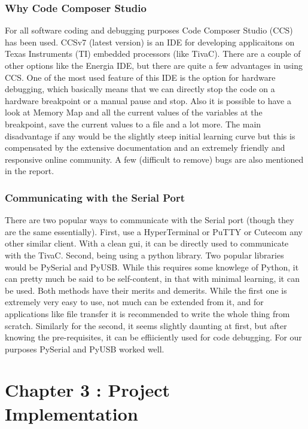 \documentclass{article}
\begin{document}
\subsubsection{Why Code Composer Studio}
For all software coding and debugging purposes Code Composer Studio (CCS) has been used. CCSv7 (latest version) is an IDE for developing applicaitons on Texas Instruments (TI) embedded processors (like TivaC). There are a couple of other options like the Energia IDE, but there are quite a few advantages in using CCS. One of the most used feature of this IDE is the option for hardware debugging, which basically means that we can directly stop the code on a hardware breakpoint or a manual pause and stop. Also it is possible to have a look at Memory Map and all the current values of the variables at the breakpoint, save the current values to a file and a lot more. The main disadvantage if any would be the slightly steep initial learning curve but this is compensated by the extensive documentation and an extremely friendly and responsive online community. A few (difficult to remove) bugs are also mentioned in the report. 

\subsubsection{Communicating with the Serial Port}
There are two popular ways to communicate with the Serial port (though they are the same essentially). First, use a HyperTerminal or PuTTY or Cutecom any other similar client. With a clean gui, it can be directly used to communicate with the TivaC. Second, being using a python library. Two popular libraries would be PySerial and PyUSB. While this requires some knowlege of Python, it can pretty much be said to be self-content, in that with minimal learning, it can be used. Both methods have their merits and demerits. While the first one is extremely very easy to use, not much can be extended from it, and for applications like file transfer it is recommended to write the whole thing from scratch. Similarly for the second, it seems slightly daunting at first, but after knowing the pre-requisites, it can be effiiciently used for code debugging. For our purposes PySerial and PyUSB worked well.
\section{Chapter 3 : Project Implementation}
\end{document}
